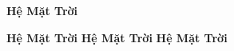 \documentclass[12pt]{article}
\begin{document}
\blindtext

\texttt{\blindtext} 

\blindtext

{\LARGE \textbf{Hệ Mặt Trời}}

\fontsize{20pt}{10pt}
\selectfont
\blindtext

{\Large \textbf{Hệ Mặt Trời}}
{\LARGE \textbf{Hệ Mặt Trời}}
{\Huge \textbf{Hệ Mặt Trời}}
\end{document}

